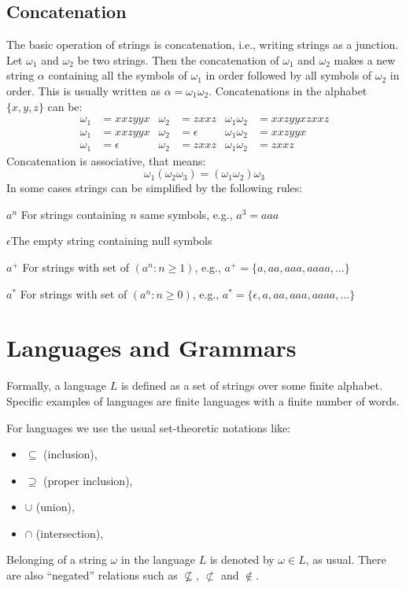 \subsection{Concatenation}
The basic operation of strings is concatenation, i.e., writing strings as a junction. Let $\omega_1$ and $\omega_2$ be two strings. Then the concatenation of $\omega_1$ and $\omega_2$ makes a new string $\alpha$ containing all the symbols of $\omega_1$ in order followed by all symbols of $\omega_2$ in order. This is usually written as $\alpha=\omega_1\omega_2$.
Concatenations in the alphabet $\{x, y, z\}$ can be:
\begin{align*}
\omega_1&=xxzyyx	& \omega_2&=zxxz	& \omega_1\omega_2&=xxzyyxzxxz\\
\omega_1&=xxzyyx	& \omega_2&=\epsilon	& \omega_1\omega_2&=xxzyyx\\
\omega_1&=\epsilon	& \omega_2&=zxxz	& \omega_1\omega_2&=zxxz
\end{align*}
Concatenation is associative, that means:
$$\omega_1(\omega_2\omega_3)=(\omega_1\omega_2)\omega_3$$
In some cases strings can be simplified by the following rules: 

$a^n$ \qquad For strings containing $n$ same symbols, e.g., $a^3=aaa$

$\epsilon$\qquad\quad The empty string containing null symbols

$a^+$ \qquad For strings with set of $(a^n:n\geq1)$, e.g., $a^+=\{a, aa, aaa, aaaa, \ldots\}$

$a^*$ \qquad For strings with set of $(a^n:n\geq0)$, e.g., $a^*=\{\epsilon, a, aa, aaa, aaaa, \ldots\}$
 
\section{Languages and Grammars}
Formally, a language $L$ is defined as a set of strings over some finite alphabet. Specific examples of languages are finite languages with a finite number of words.

For languages we use the usual set-theoretic notations like:
\begin{itemize}
\item $\subseteq$ (inclusion), 
\item $\supseteq$ (proper inclusion), 
\item $\cup$ (union), 
\item $\cap$ (intersection), 
\end{itemize}
Belonging of a string $\omega$ in the language $L$ is denoted by $\omega \in L$, as usual. There are also ``negated'' relations such as $\not\subseteq$, $\not\subset$ and $\not\in$.

